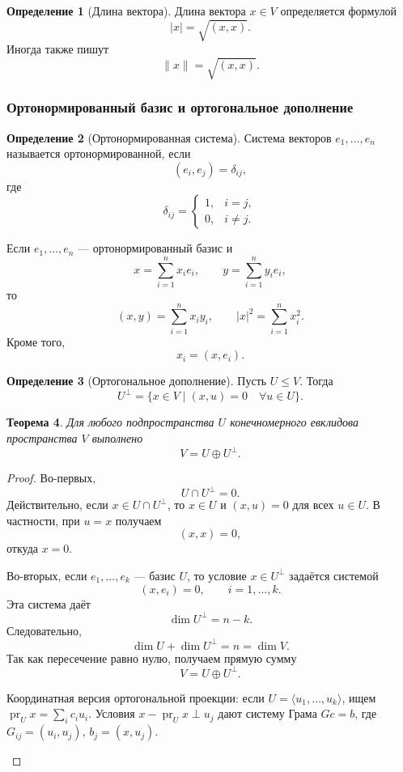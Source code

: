\documentclass[12pt,a4paper]{article}
\theoremstyle{definition}
\newtheorem{definition}{Определение}[section]
\theoremstyle{plain}
\newtheorem{theorem}[definition]{Теорема}
\theoremstyle{remark}
\newenvironment{knowledgefix}{\begin{clarifybox}}{\end{clarifybox}}
\newcommand{\pr}{\operatorname{pr}}
\begin{document}
\begin{definition}[Длина вектора]
Длина вектора $x\in V$ определяется формулой
\[
    |x|=\sqrt{(x,x)}.
\]
Иногда также пишут
\[
    \|x\|=\sqrt{(x,x)}.
\]
\end{definition}

\subsubsection*{Ортонормированный базис и ортогональное дополнение}

\begin{definition}[Ортонормированная система]
Система векторов $e_1,\ldots,e_n$ называется ортонормированной, если
\[
    (e_i,e_j)=\delta_{ij},
\]
где
\[
    \delta_{ij}=\begin{cases}
        1, & i=j,\\
        0, & i\ne j.
    \end{cases}
\]
\end{definition}

Если $e_1,\ldots,e_n$ --- ортонормированный базис и
\[
    x=\sum_{i=1}^n x_i e_i,
    \qquad
    y=\sum_{i=1}^n y_i e_i,
\]
то
\[
    (x,y)=\sum_{i=1}^n x_i y_i,
    \qquad
    |x|^2=\sum_{i=1}^n x_i^2.
\]
Кроме того,
\[
    x_i=(x,e_i).
\]

\begin{definition}[Ортогональное дополнение]
Пусть $U\le V$. Тогда
\[
    U^\perp=\{x\in V\mid (x,u)=0\quad \forall u\in U\}.
\]
\end{definition}

\begin{theorem}
Для любого подпространства $U$ конечномерного евклидова пространства $V$ выполнено
\[
    V=U\oplus U^\perp.
\]
\end{theorem}

\begin{proof}
Во-первых,
\[
    U\cap U^\perp=0.
\]
Действительно, если $x\in U\cap U^\perp$, то $x\in U$ и $(x,u)=0$ для всех $u\in U$.
В частности, при $u=x$ получаем
\[
    (x,x)=0,
\]
откуда $x=0$.

Во-вторых, если $e_1,\ldots,e_k$ --- базис $U$, то условие $x\in U^\perp$ задаётся системой
\[
    (x,e_i)=0,
    \qquad i=1,\ldots,k.
\]
Эта система даёт
\[
    \dim U^\perp=n-k.
\]
Следовательно,
\[
    \dim U+\dim U^\perp=n=\dim V.
\]
Так как пересечение равно нулю, получаем прямую сумму
\[
    V=U\oplus U^\perp.
\]
\begin{knowledgefix}
Координатная версия ортогональной проекции: если \(U=\langle u_1,
\ldots,u_k\rangle\), ищем \(\pr_U x=\sum_i c_i u_i\). Условия \(x-\pr_U x\perp u_j\) дают систему Грама \(Gc=b\), где \(G_{ij}=(u_i,u_j)\), \(b_j=(x,u_j)\).
\end{knowledgefix}
\end{proof}
\end{document}
